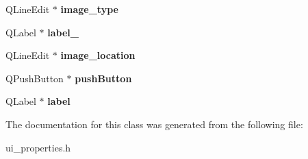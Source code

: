 \begin{DoxyCompactItemize}
\item 
\hypertarget{classUi__properties_adcc106f28130b1fd13a84ef061ac36b6}{
QLineEdit $\ast$ {\bfseries image\_\-type}}
\label{classUi__properties_adcc106f28130b1fd13a84ef061ac36b6}

\item 
\hypertarget{classUi__properties_a6702ccc6363460b0b6df3068f72785d5}{
QLabel $\ast$ {\bfseries label\_}}
\label{classUi__properties_a6702ccc6363460b0b6df3068f72785d5}

\item 
\hypertarget{classUi__properties_aecc35167b0fe37745a8d40bcf25c86d8}{
QLineEdit $\ast$ {\bfseries image\_\-location}}
\label{classUi__properties_aecc35167b0fe37745a8d40bcf25c86d8}

\item 
\hypertarget{classUi__properties_aaecc391d7033c644061cb6f1bf380bd2}{
QPushButton $\ast$ {\bfseries pushButton}}
\label{classUi__properties_aaecc391d7033c644061cb6f1bf380bd2}

\item 
\hypertarget{classUi__properties_ac89da5db2b698990b8f75f2f1f1ac43b}{
QLabel $\ast$ {\bfseries label}}
\label{classUi__properties_ac89da5db2b698990b8f75f2f1f1ac43b}

\end{DoxyCompactItemize}


The documentation for this class was generated from the following file:\begin{DoxyCompactItemize}
\item 
ui\_\-properties.h\end{DoxyCompactItemize}
